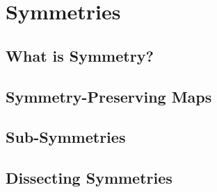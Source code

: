 \chapter{Symmetries}

\section{What is Symmetry?}

\section{Symmetry-Preserving Maps}

\section{Sub-Symmetries}

\section{Dissecting Symmetries} %

